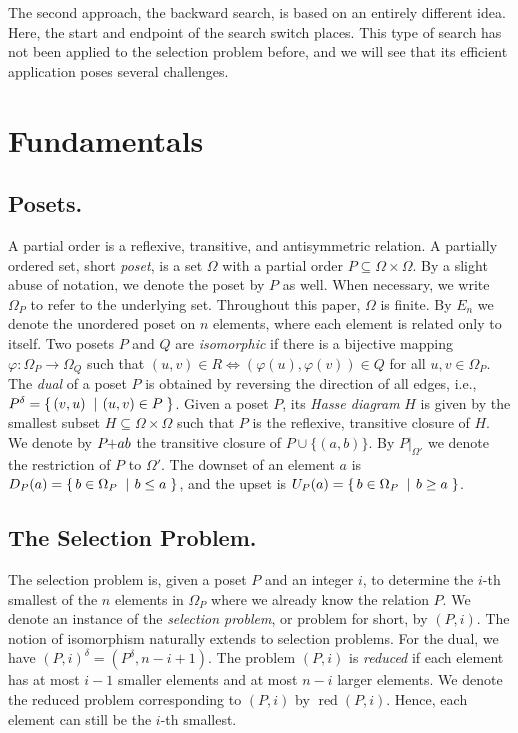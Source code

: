 \documentclass[a4paper,UKenglish,cleveref, autoref, thm-restate]{lipics-v2021}
\makeatletter
\newcommand{\set}[2]{\left\{\, \mathinner{#1}\vphantom{#2}\: \left|\: \vphantom{#1}\mathinner{#2} \right.\,\right\}}
\newcommand\ie{i.e\@., }
\newcommand{\sse}{\subseteq}
\newcommand{\pchild}[3]{{#1}\kern-1pt{+}{#2}{#3}}
\newcommand{\dual}[1]{{#1}^{\delta}}
\newcommand{\reduced}[1]{\operatorname{red}{#1}}
\newcommand{\less}[2]{D_{#1}(#2)}
\newcommand{\greater}[2]{U_{#1}(#2)}
\makeatother
\begin{document}
The second approach, the backward search, is based on an entirely different idea.
Here, the start and endpoint of the search switch places.
This type of search has not been applied to the selection problem before, and we will see that its efficient application poses several challenges.

\section{Fundamentals}

\subsection{Posets.}
A partial order is a reflexive, transitive, and antisymmetric relation.
A partially ordered set, short \emph{poset}, is a set $\Omega$ with a partial order $P \subseteq \Omega \times \Omega$.
By a slight abuse of notation, we denote the poset by $P$ as well.
When necessary, we write $\Omega_P$ to refer to the underlying set.
Throughout this paper, $\Omega$ is finite.
By $E_n$ we denote the unordered poset on $n$ elements, where each element is related only to itself.
Two posets $P$ and $Q$ are \emph{isomorphic} if there is a bijective mapping $\varphi: \Omega_P \to \Omega_Q$ such that $(u, v) \in R \iff (\varphi(u), \varphi(v)) \in Q$ for all $u, v \in \Omega_P$.
The \emph{dual} of a poset $P$ is obtained by reversing the direction of all edges, \ie $\dual{P} = \set{(v,u)}{(u,v) \in P}$.
Given a poset $P$, its \emph{Hasse diagram} $H$ is given by the smallest subset $H \sse \Omega \times \Omega$ such that $P$ is the reflexive, transitive closure of $H$.
We denote by $\pchild{P}{a}{b}$ the transitive closure of $P \cup \{(a, b)\}$.
By $P|_{\Omega'}$ we denote the restriction of $P$ to $\Omega'$.
The downset of an element $a$ is $\less{P}{a} = \set{b \in \Omega_P}{b \le a}$, and the upset is $\greater{P}{a} = \set{b \in \Omega_P}{b \ge a}$.

\subsection{The Selection Problem.}
The selection problem is, given a poset $P$ and an integer $i$, to determine the $i$-th smallest of the $n$ elements in $\Omega_P$ where we already know the relation $P$.
We denote an instance of the \emph{selection problem}, or problem for short, by $(P, i)$.
The notion of isomorphism naturally extends to selection problems.
For the dual, we have $\dual{(P, i)} = (\dual{P}, n - i + 1)$.
The problem $(P, i)$ is \emph{reduced} if each element has at most $i - 1$ smaller elements and at most $n - i$ larger elements.
We denote the reduced problem corresponding to $(P, i)$ by $\reduced{(P, i)}$.
Hence, each element can still be the $i$-th smallest.
\end{document}

